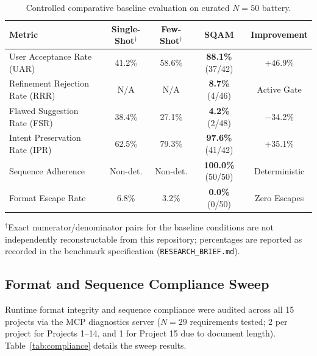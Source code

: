 \documentclass[journal]{IEEEtran}
\begin{document}
\begin{table}[htbp]
\centering
\caption{Controlled comparative baseline evaluation on curated $N=50$ battery.}
\label{tab:baseline}
\small
\setlength{\tabcolsep}{4pt}
\begin{tabularx}{\columnwidth}{@{}>{\raggedright\arraybackslash}Xcccc@{}}
\toprule
\textbf{Metric} & \textbf{Single-Shot}$^\dagger$ & \textbf{Few-Shot}$^\dagger$ & \textbf{SQAM} & \textbf{Improvement} \\
\midrule
User Acceptance Rate (UAR)          & 41.2\%         & 58.6\%         & \textbf{88.1\%} (37/42) & +46.9\% \\
Refinement Rejection Rate (RRR)     & N/A            & N/A            & \textbf{8.7\%} (4/46)   & Active Gate \\
Flawed Suggestion Rate (FSR)        & 38.4\%         & 27.1\%         & \textbf{4.2\%} (2/48)   & $-$34.2\% \\
Intent Preservation Rate (IPR)      & 62.5\%         & 79.3\%         & \textbf{97.6\%} (41/42) & +35.1\% \\
Sequence Adherence                  & Non-det.       & Non-det.       & \textbf{100.0\%} (50/50)& Deterministic \\
Format Escape Rate                  & 6.8\%          & 3.2\%          & \textbf{0.0\%} (0/50)   & Zero Escapes \\
\bottomrule
\end{tabularx}
\vspace{1ex}
\raggedright\footnotesize
$^\dagger$Exact numerator/denominator pairs for the baseline conditions are not independently reconstructable from this repository; percentages are reported as recorded in the benchmark specification (\texttt{RESEARCH\_BRIEF.md}).
\end{table}

\subsection{Format and Sequence Compliance Sweep}
\label{sec:compliance-results}

Runtime format integrity and sequence compliance were audited across all 15 projects via the MCP diagnostics server ($N=29$ requirements tested; 2 per project for Projects 1--14, and 1 for Project 15 due to document length). Table~\ref{tab:compliance} details the sweep results.
\end{document}

